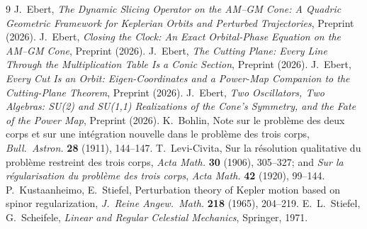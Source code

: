 \documentclass[12pt]{amsart}
\theoremstyle{plain}
\theoremstyle{remark}
\begin{document}
\begin{thebibliography}{9}
 J.~Ebert, \emph{The Dynamic Slicing Operator on the AM--GM Cone: A Quadric Geometric Framework for Keplerian Orbits and Perturbed Trajectories}, Preprint (2026).
 J.~Ebert, \emph{Closing the Clock: An Exact Orbital-Phase Equation on the AM--GM Cone}, Preprint (2026).
 J.~Ebert, \emph{The Cutting Plane: Every Line Through the Multiplication Table Is a Conic Section}, Preprint (2026).
 J.~Ebert, \emph{Every Cut Is an Orbit: Eigen-Coordinates and a Power-Map Companion to the Cutting-Plane Theorem}, Preprint (2026).
 J.~Ebert, \emph{Two Oscillators, Two Algebras: SU(2) and SU(1,1) Realizations of the Cone's Symmetry, and the Fate of the Power Map}, Preprint (2026).
 K.~Bohlin, Note sur le probl\`eme des deux corps et sur une int\'egration nouvelle dans le probl\`eme des trois corps, \emph{Bull.\ Astron.} \textbf{28} (1911), 144--147.
 T.~Levi-Civita, Sur la r\'esolution qualitative du probl\`eme restreint des trois corps, \emph{Acta Math.} \textbf{30} (1906), 305--327; and \emph{Sur la r\'egularisation du probl\`eme des trois corps}, \emph{Acta Math.} \textbf{42} (1920), 99--144.
 P.~Kustaanheimo, E.~Stiefel, Perturbation theory of Kepler motion based on spinor regularization, \emph{J.\ Reine Angew.\ Math.} \textbf{218} (1965), 204--219.
 E.~L.~Stiefel, G.~Scheifele, \emph{Linear and Regular Celestial Mechanics}, Springer, 1971.
\end{thebibliography}
\end{document}
